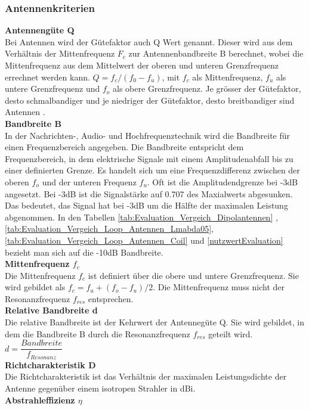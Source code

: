 \subsubsection{Antennenkriterien}
\textbf{Antennengüte Q}\\
Bei Antennen wird der Gütefaktor auch Q Wert genannt. Dieser wird aus dem Verhältnis der Mittenfrequenz $F_{c}$ zur Antennenbandbreite B berechnet, wobei die Mittenfrequenz aus dem Mittelwert der oberen und unteren Grenzfrequenz errechnet werden kann. $Q = f_c/(f_0-f_u)$, mit $f_c$ als Mittenfrequenz, $f_u$ als untere Grenzfrequenz und $f_o$ als obere Grenzfrequenz. Je grösser der Gütefaktor, desto schmalbandiger und je niedriger der Gütefaktor,  desto breitbandiger sind Antennen \cite{Guetefaktor_Q}.\\
\textbf{Bandbreite B}\\
In der Nachrichten-, Audio- und Hochfrequenztechnik wird die Bandbreite für einen Frequenzbereich angegeben. Die Bandbreite entspricht dem Frequenzbereich, in dem elektrische Signale mit einem Amplitudenabfall  bis zu einer definierten Grenze. Es handelt sich um eine Frequenzdifferenz zwischen der oberen $f_o$ und der unteren Frequenz $f_u$. Oft ist die Amplitudendgrenze bei -3dB angesetzt. Bei -3dB ist die Signalstärke auf 0.707 des Maxialwerts abgesunken. Das bedeutet, das Signal hat bei -3dB um die Hälfte der maximalen Leistung abgenommen\cite{Bandbreite_B}.
In den Tabellen \ref{tab:Evaluation_Vergeich_Dipolantennen} ,\ref{tab:Evaluation_Vergeich_Loop_Antennen_Lmabda05}, \ref{tab:Evaluation_Vergeich_Loop_Antennen_Coil} und \ref{nutzwertEvaluation} bezieht man sich auf die -10dB Bandbreite.\\
\textbf{Mittenfrequenz $f_{c}$}\\
Die Mittenfrequenz $f_c$ ist definiert über die obere und untere Grenzfrequenz. Sie wird gebildet als $f_c=f_u+(f_o-f_u)/2$. Die Mittenfrequenz muss nicht der Resonanzfrequenz $f_{res}$ entsprechen.\\
\textbf{Relative  Bandbreite d}\\
Die relative Bandbreite ist der Kehrwert der Antennegüte Q.
Sie wird gebildet, in dem die Bandbreite B durch die Resonanzfrequenz $f_{res}$ geteilt wird. $d=\dfrac{Bandbreite}{f_{Resonanz}}$\\
\textbf{Richtcharakteristik D}\\
Die Richtcharakteristik ist das Verhältnis der maximalen Leistungsdichte der Antenne gegenüber einem isotropen Strahler in dBi.\\
\textbf{Abstrahleffizienz $\eta$}\\
